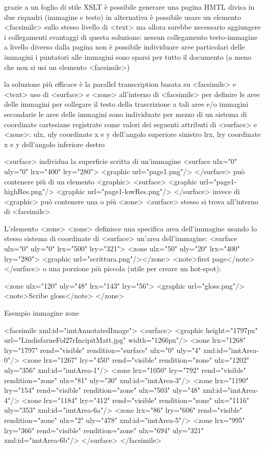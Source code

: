 grazie a un foglio di stile XSLT è possibile generare una pagina HMTL divisa in due riquadri (immagine e testo)
in alternativa è possibile usare un elemento <facsimile> sullo stesso livello di <text>
ma allora sarebbe necessario aggiungere i collegamenti svantaggi di questa soluzione:
nessun collegamento testo-immagine a livello diverso dalla pagina
non è possibile individuare aree particolari delle immagini
i puntatori alle immagini sono sparsi per tutto il documento (a
meno che non si usi un elemento <facsimile>)

la soluzione più efficace è la parallel transcription basata su <facsimile> e <text>
uso di <surface> e <zone> all’interno di <facsimile>
per definire le aree delle immagini
per collegare il testo della trascrizione a tali aree e/o immagini secondarie
le aree delle immagini sono individuate per mezzo di un sistema di coordinate cartesiane registrate come valori dei seguenti attributi di <surface> e <zone>:
ulx, uly coordinate x e y dell’angolo superiore sinistro lrx, lry coordinate x e y dell’angolo inferiore destro

<surface> individua la superficie scritta di un’immagine
<surface ulx="0" uly="0" lrx="400" lry="280"> <graphic url="page1.png"/>
</surface>
può contenere più di un elemento <graphic>
<surface>
<graphic url="page1-highRes.png"/> <graphic url="page1-lowRes.png"/>
</surface>
invece di <graphic> può contenere una o più <zone> <surface> stesso si trova all’interno di <facsimile>

L’elemento <zone>
<zone> definisce una specifica area dell’immagine usando lo stesso sistema di coordinate di <surface>
un’area dell’immagine:
<surface ulx="0" uly="0" lrx="500" lry="321"> <zone ulx="50" uly="20" lrx="400" lry="280">
<graphic url="scrittura.png"/></zone> <note>first page</note>
</surface>
o una porzione più piccola (utile per creare un hot-spot):

<zone ulx="120" uly="48" lrx="143" lry="56">
 <graphic url="gloss.png"/>
 <note>Scribe gloss</note>
</zone>

Esempio immagine zone

<facsimile xml:id="imtAnnotatedImage"> <surface>
<graphic height="1797px" url="LindisfarneFol27rIncipitMatt.jpg" width="1266px"/>
<zone lrx="1268" lry="1797" rend="visible" rendition="surface" ulx="0" uly="4" xml:id="imtArea-0"/>
<zone lrx="1267" lry="450" rend="visible" rendition="zone" ulx="1202" uly="356" xml:id="imtArea-1"/>
<zone lrx="1050" lry="792" rend="visible" rendition="zone" ulx="81" uly="30" xml:id="imtArea-3"/>
<zone lrx="1190" lry="154" rend="visible" rendition="zone" ulx="503" uly="48" xml:id="imtArea-4"/>
<zone lrx="1184" lry="412" rend="visible" rendition="zone" ulx="1116" uly="353" xml:id="imtArea-6a"/>
<zone lrx="86" lry="606" rend="visible" rendition="zone" ulx="2" uly="478" xml:id="imtArea-5"/>
<zone lrx="995" lry="366" rend="visible" rendition="zone" ulx="694" uly="321" xml:id="imtArea-6b"/>
  </surface>
</facsimile>

